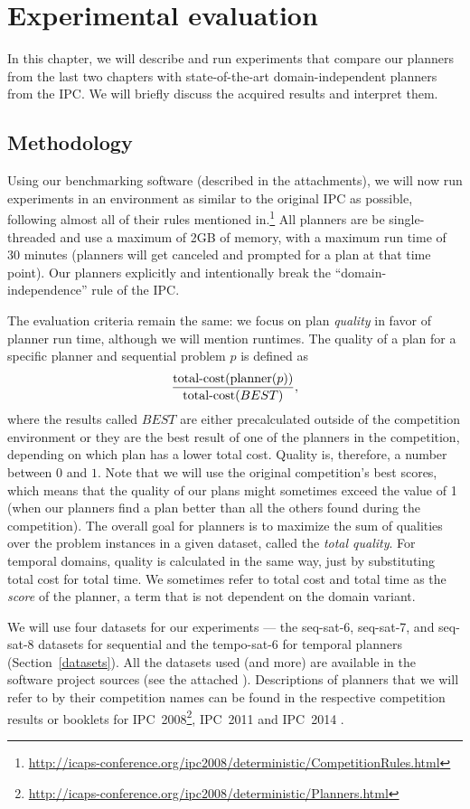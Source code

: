 \chapter{Experimental evaluation}

In this chapter, we will describe and run experiments
that compare our planners from the last two chapters
with state-of-the-art domain-independent planners from the IPC.
We will briefly discuss the acquired results and interpret them.

\section{Methodology}

Using our benchmarking software (described in the attachments), we will now run experiments in an
environment as similar to the original
IPC as possible, following almost all of their rules mentioned in.\footnote{\url{http://icaps-conference.org/ipc2008/deterministic/CompetitionRules.html}}
All planners are be single-threaded and use a maximum of 2GB of memory, with a maximum run time of 30 minutes (planners will
get canceled and prompted for a plan at that time point).
Our planners explicitly and intentionally break the ``domain-independence'' rule of the IPC.

The evaluation criteria remain the same:
we focus on plan \textit{quality} in favor of planner run time,
although we will mention runtimes.
The quality of a plan for a specific planner and sequential problem $p$ is defined as
$$\frac{\textrm{total-cost}(\textrm{planner}(p))}{\textrm{total-cost}(BEST)},$$
where the results called $BEST$
are either precalculated outside of the competition environment or they are the best result of one of the planners in the competition, depending on which plan has a lower total cost.
Quality is, therefore, a number between $0$ and $1$.
Note that we will use the original competition's best scores,
which means that the quality of our plans
might sometimes exceed the value of 1
(when our planners find a plan better than all the others found during the competition).
The overall goal for planners is to maximize the sum of qualities over the problem instances in a given dataset, called the \textit{total quality}.
For temporal domains, quality is calculated in the same way, just by substituting total cost
for total time. We sometimes refer to total cost and total time as the \textit{score} of the planner, a term that is not dependent on the domain variant.

We will use four datasets for our experiments --- the seq-sat-6, seq-sat-7,
and seq-sat-8 datasets for sequential
and the tempo-sat-6 for temporal planners (Section~\ref{datasets}).
All the datasets used (and more) are available in the
software project sources (see the attached ).
Descriptions of planners that we will refer to by their competition names can be found in the respective competition results or booklets for IPC~2008\footnote{\url{http://icaps-conference.org/ipc2008/deterministic/Planners.html}}, IPC~2011 \citep{Garcia-Olaya2011} and IPC~2014 \citep{Vallati2015}.

